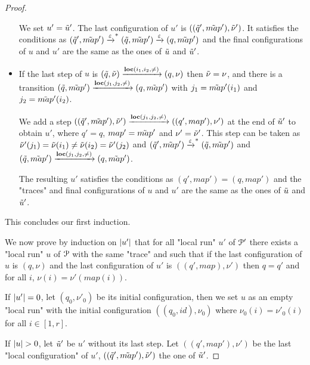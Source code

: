 \begin{proof}
\begin{itemize}
		We set $u' = \Tilde{u}'$. The last configuration of $u'$ is $((\Tilde{q}', \Tilde{map}'), \Tilde{\nu}')$. It satisfies the conditions as $(\Tilde{q}', \Tilde{map}') \xrightarrow{\varepsilon}^* (\Tilde{q}, \Tilde{map}') \xrightarrow{\varepsilon} (q, \Tilde{map}')$ and the final configurations of $u$ and $u'$ are the same as the ones of $\Tilde{u}$ and $\Tilde{u}'$.
		
		\item 
		If the last step of $u$ is $(\Tilde{q}, \Tilde{\nu}) \xrightarrow{\textbf{loc}(i_1,i_2,{\ne})} (q, \nu)$ then $\Tilde{\nu} = \nu$, and there is a transition $(\Tilde{q}, \Tilde{map}') \xrightarrow{\textbf{loc}(j_1,j_2,{\ne})} (q, \Tilde{map}')$ with $j_1=\Tilde{map}'(i_1)$ and $j_2=\Tilde{map}'(i_2)$.
		
		We add a step $((\Tilde{q}', \Tilde{map}'), \Tilde{\nu}') \xrightarrow{\textbf{loc}(j_1,j_2,{\ne})} ((q', map'), \nu')$ at the end of $\Tilde{u}'$ to obtain $u'$, where $q' = q$, $map' = \Tilde{map}'$ and $\nu' = \Tilde{\nu}'$. 
		This step can be taken as $\Tilde{\nu}'(j_1) = \Tilde{\nu}(i_1) \neq \Tilde{\nu}(i_2) = \Tilde{\nu}'(j_2)$ and $(\Tilde{q}', \Tilde{map}') \xrightarrow{\varepsilon}^* (\Tilde{q}, \Tilde{map}')$ and $(\Tilde{q}, \Tilde{map}') \xrightarrow{\textbf{loc}(j_1,j_2,{\ne})} (q, \Tilde{map}')$.   
		
		The resulting $u'$ satisfies the conditions as $(q', map') = (q, map')$ and the "traces" and final configurations of $u$ and $u'$ are the same as the ones of $\Tilde{u}$ and $\Tilde{u}'$.
	\end{itemize}
	
	This concludes our first induction.
	
	We now prove by induction on $|u'|$ that for all "local run" $u'$ of $\mathcal{P}'$ there exists a "local run" $u$ of $\mathcal{P}$ with the same "trace" and such that if the last configuration of $u$ is $(q,\nu)$ and the last configuration of $u'$ is $((q',map), \nu')$ then $q=q'$ and for all $i$, $\nu(i) = \nu'(map(i))$.  
	
	If $|u'| = 0$, let $(q_0, \nu'_0)$ be its initial configuration, then we  set $u$ as an empty "local run" with the initial configuration $((q_0, id), \nu_0)$ where $\nu_0(i) = \nu'_0(i)$ for all $i \in [1,r]$.
	
	If $\size{u}>0$, let $\Tilde{u}'$ be $u'$ without its last step. Let $((q', map'), \nu')$ be the last "local configuration" of $u'$, $((\Tilde{q}', \Tilde{map}'), \Tilde{\nu}')$ the one of $\Tilde{u}'$.
	

\end{proof}
